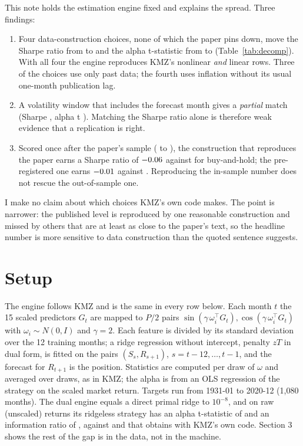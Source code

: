 \documentclass[11pt]{article}
\begin{document}
This note holds the estimation engine fixed and explains the spread. Three findings:
\begin{enumerate}\itemsep0pt
\item Four data-construction choices, none of which the paper pins down, move the Sharpe ratio from \nDecASR{} to
\nDecFourSR{} and the alpha t-statistic from \nDecAT{} to \nDecFourT{} (Table~\ref{tab:decomp}). With all four the
engine reproduces KMZ's nonlinear \emph{and} linear rows. Three of the choices use only past data; the fourth uses
inflation without its usual one-month publication lag.
\item A volatility window that includes the forecast month gives a \emph{partial} match (Sharpe \nLaSR{}, alpha t
\nLaT{}). Matching the Sharpe ratio alone is therefore weak evidence that a replication is right.
\item Scored once after the paper's sample (\nPostFirst{} to \nPostLast), the construction that reproduces the
paper earns a Sharpe ratio of $-0.06$ against \nBPostBH{} for buy-and-hold; the pre-registered one earns
$-0.01$ against \nAPostBH. Reproducing the in-sample number does not rescue the out-of-sample one.
\end{enumerate}
I make no claim about which choices KMZ's own code makes. The point is narrower: the published level is reproduced
by one reasonable construction and missed by others that are at least as close to the paper's text, so the
headline number is more sensitive to data construction than the quoted sentence suggests.

\section{Setup}

The engine follows KMZ and is the same in every row below. Each month $t$ the 15 scaled predictors $G_t$ are
mapped to $P/2$ pairs $\sin(\gamma\,\omega_i^{\top} G_t), \cos(\gamma\,\omega_i^{\top} G_t)$ with $\omega_i \sim
N(0, I)$ and $\gamma = 2$. Each feature is divided by its standard deviation over the 12 training months; a ridge
regression without intercept, penalty $z T$ in dual form, is fitted on the pairs $(S_{s}, R_{s+1})$,
$s = t-12, \dots, t-1$, and the forecast for $R_{t+1}$ is the position. Statistics are computed per draw of
$\omega$ and averaged over draws, as in KMZ; the alpha is from an OLS regression of the strategy on the scaled
market return. Targets run from 1931-01 to 2020-12 (1{,}080 months). The dual engine equals a direct primal ridge
to $10^{-8}$, and on raw (unscaled) returns its ridgeless strategy has an alpha t-statistic of \nRawZeroT{}
and an information ratio of \nRawZeroIR, against \nNagelRawT{} and \nNagelRawIR{} that \citet{nagel2025} obtains
with KMZ's own code. Section 3 shows the rest of the gap is in the data, not in the machine.
\end{document}
